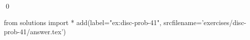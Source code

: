 
\begin{ex} 
  \label{ex:disc-prob-41}
  
  \qed
\end{ex} 
\begin{python0}
from solutions import *
add(label="ex:disc-prob-41",
    srcfilename='exercises/disc-prob-41/answer.tex') 
\end{python0}
